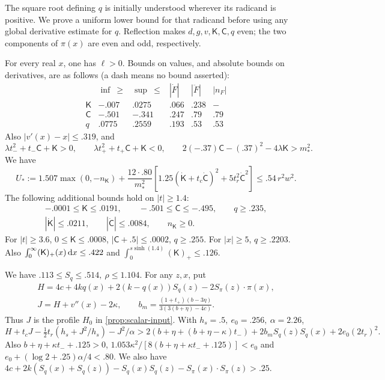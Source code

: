 The square root defining $q$ is initially understood wherever its radicand is positive. We prove a uniform lower bound for that radicand before using any global derivative estimate for $q$. Reflection makes $d,g,v,\mathsf K,\mathsf C,q$ even; the two components of $\pi(x)$ are even and odd, respectively.

\begin{lemma}\label{lem:scalar-ranges}
For every real $x$, one has $\ell>0$. Bounds on values, and absolute bounds on derivatives, are as follows (a dash means no bound asserted):
\[
\begin{array}{c|cc|ccc}
 &\inf\ \ge &\sup\ \le & |\dot F|& |\ddot F| & |n_F| \\ \hline
 \mathsf K&-.007&.0275&.066&.238&-\\
 \mathsf C&-.501&-.341&.247&.79&.79\\
 q&.0775&.2559&.193&.53&.53
\end{array}
\]
Also $|v'(x)-x|\le .319$, and
\[
 \lambda t_-^2+t_-\mathsf C+\mathsf K>0,\qquad
 \lambda t_+^2+t_+\mathsf C+\mathsf K<0,\qquad
 2(-.37)\mathsf C-(.37)^2-4\lambda\mathsf K > m_*^2.
\]
We have
\[
 U_*:=1.507\max(0,-n_{\mathsf K})+
 \frac{12\cdot .80}{m_*^2}
 \left[1.25(\dot{\mathsf K}+t_c\dot{\mathsf C})^2+5t_r^2 \dot{\mathsf C}^2\right]
 \le .54\,r^2 w^2 .
\]
The following additional bounds hold on $|t|\ge1.4$:
\[
\begin{gathered}
 -.0001\le\mathsf K\le.0191,\qquad -.501\le\mathsf C\le-.495,\qquad q\geq .235,\\
 |\dot{\mathsf K}|\le .0211,\qquad |\dot{\mathsf C}|\le .0084,\qquad n_{\mathsf K}\ge0.
\end{gathered}
\]
For $|t|\ge3.6$, $0\le\mathsf K\le .0008$, $|\mathsf C+.5|\le .0002$, $q\ge .255$. For $|x|\ge5$, $q\ge.2203$. Also $\int_0^\infty (\mathsf K)_+(x)\,\mathrm{d} x\le.422$ and $\int_0^{s\sinh(1.4)}(\mathsf K)_+\le .126$.
\end{lemma}

\begin{lemma}\label{lem:scalar-layer}
We have $.113\le S_q\le .514,\ \rho\le1.104$. For any $z,x$, put
\[
 \begin{gathered}
 H=4c+4kq(x)+2(k-q(x))S_q(z)-2S_\pi(z)\cdot\pi(x),\\
 J=H+v''(x)-2\kappa,
 \qquad b_m=\frac{(1+t_+)(b-3\eta)}{3(3(b+\eta)-4c)}.
 \end{gathered}
\]
Thus $J$ is the profile $H_0$ in \cref{prop:scalar-input}. With $h_s=.5,\ e_0=.256,\ \alpha=2.26$,
\[
 H+t_cJ-\tfrac12 t_r(h_s+J^2/h_s)-J^2/\alpha >
 2(b+\eta+(b+\eta-\kappa)t_-)+2b_m S_q(z)S_q(x)+2e_0(2t_r)^2 .
\]
Also $b+\eta+\kappa t_-+.125>0$, $1.053\kappa^2/[8(b+\eta+\kappa t_-+.125)]<e_0$ and $e_0+(\log2+.25)\alpha/4<.80$. We also have $4c+2k(S_q(x)+S_q(z))-S_q(x)S_q(z)-S_\pi(x)\cdot S_\pi(z)>.25$.

\end{lemma}

